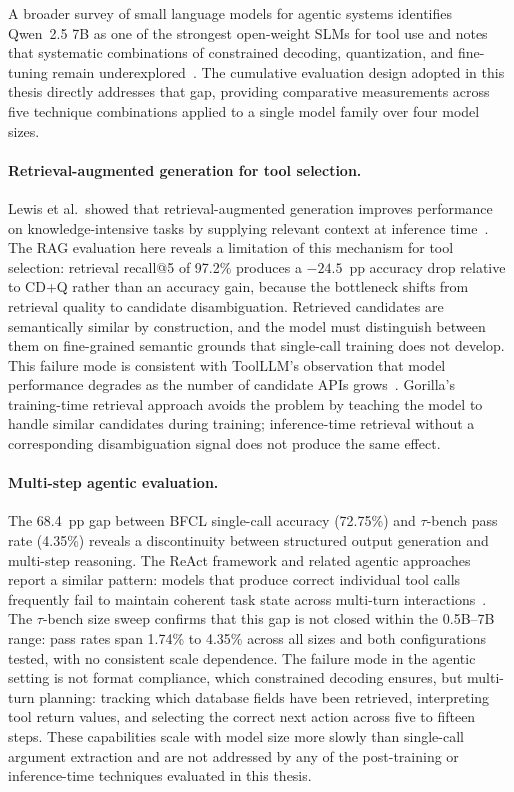 A broader survey of small language models for agentic systems identifies
Qwen~2.5 7B as one of the strongest open-weight SLMs for tool use and notes that
systematic combinations of constrained decoding, quantization, and fine-tuning
remain underexplored~\cite{sharma2025slmagents}. The cumulative evaluation
design adopted in this thesis directly addresses that gap, providing
comparative measurements across five technique combinations applied to a
single model family over four model sizes.

\paragraph{Retrieval-augmented generation for tool selection.}
Lewis et al.\ showed that retrieval-augmented generation improves performance
on knowledge-intensive tasks by supplying relevant context at inference
time~\cite{lewis2020retrieval}. The RAG evaluation here reveals a limitation
of this mechanism for tool selection: retrieval recall@5 of 97.2\% produces a
$-24.5$~pp accuracy drop relative to CD+Q rather than an accuracy gain, because the bottleneck
shifts from retrieval quality to candidate disambiguation. Retrieved candidates
are semantically similar by construction, and the model must distinguish
between them on fine-grained semantic grounds that single-call training does
not develop. This failure mode is consistent with ToolLLM's observation that
model performance degrades as the number of candidate APIs
grows~\cite{qin2024toolllm}. Gorilla's training-time retrieval approach avoids
the problem by teaching the model to handle similar candidates during training;
inference-time retrieval without a corresponding disambiguation signal does not
produce the same effect.

\paragraph{Multi-step agentic evaluation.}
The 68.4~pp gap between BFCL single-call accuracy (72.75\%) and $\tau$-bench
pass rate (4.35\%) reveals a discontinuity between structured output generation
and multi-step reasoning. The ReAct framework and related agentic approaches
report a similar pattern: models that produce correct individual tool calls
frequently fail to maintain coherent task state across multi-turn
interactions~\cite{yao2023react}. The $\tau$-bench size sweep confirms that
this gap is not closed within the 0.5B--7B range: pass rates span 1.74\% to
4.35\% across all sizes and both configurations tested, with no consistent
scale dependence. The failure mode in the agentic setting is not format
compliance, which constrained decoding ensures, but multi-turn planning:
tracking which database fields have been retrieved, interpreting tool return
values, and selecting the correct next action across five to fifteen steps.
These capabilities scale with model size more slowly than single-call argument
extraction and are not addressed by any of the post-training or
inference-time techniques evaluated in this thesis.
